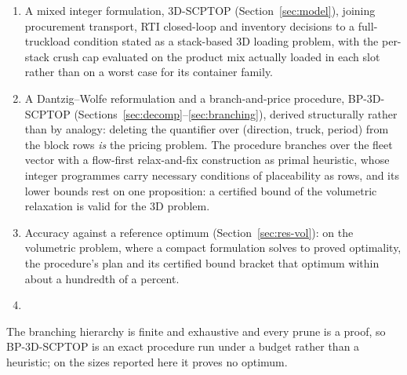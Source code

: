 \begin{enumerate}
\item A mixed integer formulation, 3D-SCPTOP
  (Section~\ref{sec:model}), joining procurement transport, RTI
  closed-loop and inventory decisions to a full-truckload condition
  stated as a stack-based 3D loading problem, with the per-stack crush
  cap evaluated on the product mix actually loaded in each slot rather
  than on a worst case for its container family.

\item A Dantzig--Wolfe reformulation \autocite{DantzigWolfe1960} and a
  branch-and-price procedure, BP-3D-SCPTOP
  (Sections~\ref{sec:decomp}--\ref{sec:branching}), derived
  structurally rather than by analogy: deleting the quantifier over
  (direction, truck, period) from the block rows \emph{is} the pricing
  problem. The procedure branches over the fleet vector with a
  flow-first relax-and-fix construction as primal heuristic, whose
  integer programmes carry necessary conditions of placeability as
  rows, and its
  lower bounds rest on one proposition: a certified bound of the
  volumetric relaxation is valid for the 3D problem.

\item Accuracy against a reference optimum
  (Section~\ref{sec:res-vol}): on the volumetric problem, where a
  compact formulation solves to proved optimality, the procedure's plan
  and its certified bound bracket that optimum within about a hundredth
  of a percent.

\item {}
\end{enumerate}

The branching hierarchy is finite and exhaustive and every prune is a
proof, so BP-3D-SCPTOP is an exact procedure run under a budget rather
than a heuristic; on the sizes reported here it proves no optimum.
